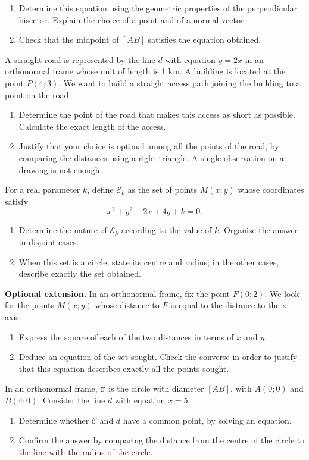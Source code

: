 \begin{enumerate}[label=\arabic*.]
\item Determine this equation using the geometric properties of the perpendicular bisector. Explain the choice of a point and of a normal vector.
\item Check that the midpoint of $[AB]$ satisfies the equation obtained.
\end{enumerate}
A straight road is represented by the line $d$ with equation $y=2x$ in an orthonormal frame whose unit of length is 1 km. A building is located at the point $P(4;3)$. We want to build a straight access path joining the building to a point on the road.
\begin{enumerate}[label=\arabic*.]
\item Determine the point of the road that makes this access as short as possible. Calculate the exact length of the access.
\item Justify that your choice is optimal among all the points of the road, by comparing the distances using a right triangle. A single observation on a drawing is not enough.
\end{enumerate}
For a real parameter $k$, define $\mathcal E_k$ as the set of points $M(x;y)$ whose coordinates satisfy\[x^2+y^2-2x+4y+k=0.\]
\begin{enumerate}[label=\arabic*.]
\item Determine the nature of $\mathcal E_k$ according to the value of $k$. Organise the answer in disjoint cases.
\item When this set is a circle, state its centre and radius; in the other cases, describe exactly the set obtained.
\end{enumerate}
\textbf{Optional extension.} In an orthonormal frame, fix the point $F(0;2)$. We look for the points $M(x;y)$ whose distance to $F$ is equal to the distance to the x-axis.
\begin{enumerate}[label=\arabic*.]
\item Express the square of each of the two distances in terms of $x$ and $y$.
\item Deduce an equation of the set sought. Check the converse in order to justify that this equation describes exactly all the points sought.
\end{enumerate}
In an orthonormal frame, $\mathcal C$ is the circle with diameter $[AB]$, with $A(0;0)$ and $B(4;0)$. Consider the line $d$ with equation $x=5$.
\begin{enumerate}[label=\arabic*.]
\item Determine whether $\mathcal C$ and $d$ have a common point, by solving an equation.
\item Confirm the answer by comparing the distance from the centre of the circle to the line with the radius of the circle.
\end{enumerate}
